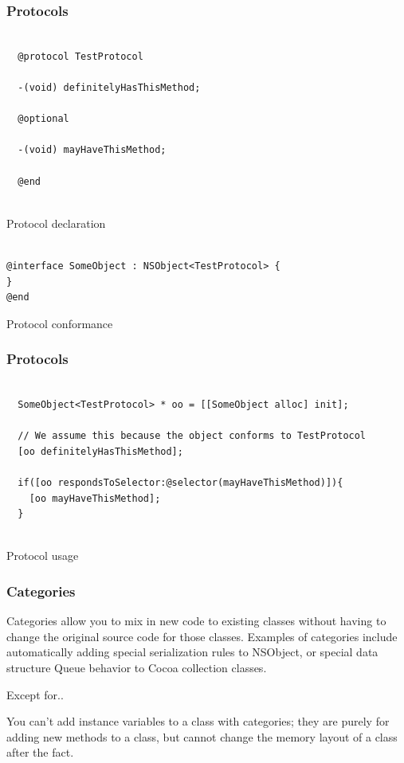 \documentclass[10pt]{beamer}
\begin{document}
\begin{frame}[fragile]
  \frametitle{Protocols}
  \begin{listing}[H]
    \begin{verbatim}
  
  @protocol TestProtocol
  
  -(void) definitelyHasThisMethod;
  
  @optional
  
  -(void) mayHaveThisMethod;
  
  @end
              
  \end{verbatim}
    \caption{Protocol declaration}
    \label{listing:15}
  \end{listing}
\begin{listing}[H]
  \begin{verbatim}

@interface SomeObject : NSObject<TestProtocol> {
}
@end
\end{verbatim}
  \caption{Protocol conformance}
  \label{listing:16}
\end{listing}

\end{frame}

\begin{frame}[fragile]
  \frametitle{Protocols}
  \begin{listing}[H]
    \begin{verbatim}
  
  SomeObject<TestProtocol> * oo = [[SomeObject alloc] init];
  
  // We assume this because the object conforms to TestProtocol
  [oo definitelyHasThisMethod];
  
  if([oo respondsToSelector:@selector(mayHaveThisMethod)]){
    [oo mayHaveThisMethod];
  }
              
  \end{verbatim}
    \caption{Protocol usage}
    \label{listing:17}
  \end{listing}

\end{frame}

    
\begin{frame}[fragile]
  \frametitle{Categories}
  Categories allow you to mix in new code to existing classes without having to change the original source code for those classes.  Examples of categories include automatically adding special serialization rules to NSObject, or special data structure Queue behavior to Cocoa collection classes.
\begin{alertblock}{Except for..}
  
  You can't add instance variables to a class with categories; they are
  purely for adding new methods to a class, but cannot change the memory
  layout of a class after the fact.
              
  \end{alertblock}

\end{frame}
\end{document}
